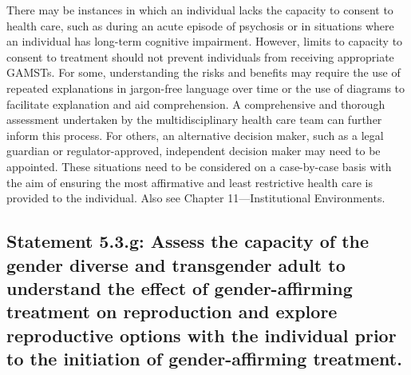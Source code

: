 \documentclass[
]{book}
\begin{document}
There may be instances in which an individual
lacks the capacity to consent to health care, such
as during an acute episode of psychosis or in
situations where an individual has long-term cognitive impairment. However, limits to capacity to
consent to treatment should not prevent individuals from receiving appropriate GAMSTs. For
some, understanding the risks and benefits may
require the use of repeated explanations in
jargon-free language over time or the use of diagrams to facilitate explanation and aid comprehension. A comprehensive and thorough
assessment undertaken by the multidisciplinary
health care team can further inform this process.
For others, an alternative decision maker, such
as a legal guardian or regulator-approved,
independent decision maker may need to be
appointed. These situations need to be considered
on a case-by-case basis with the aim of ensuring
the most affirmative and least restrictive health
care is provided to the individual. Also see
Chapter 11---Institutional Environments.

\hypertarget{statement-5.3.g-assess-the-capacity-of-the-gender-diverse-and-transgender-adult-to-understand-the-effect-of-gender-affirming-treatment-on-reproduction-and-explore-reproductive-options-with-the-individual-prior-to-the-initiation-of-gender-affirming-treatment.}{%
\subsection*{Statement 5.3.g: Assess the capacity of the gender diverse and transgender adult to understand the effect of gender-affirming treatment on reproduction and explore reproductive options with the individual prior to the initiation of gender-affirming treatment.}\label{statement-5.3.g-assess-the-capacity-of-the-gender-diverse-and-transgender-adult-to-understand-the-effect-of-gender-affirming-treatment-on-reproduction-and-explore-reproductive-options-with-the-individual-prior-to-the-initiation-of-gender-affirming-treatment.}}
\end{document}
